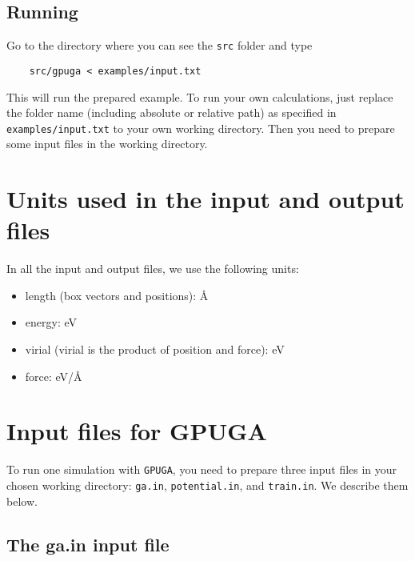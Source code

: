 \documentclass[12pt,a4paper]{report}
\begin{document}
\subsection{Running}

Go to the directory where you can see the \verb"src" folder and type
\begin{verbatim}
    src/gpuga < examples/input.txt
\end{verbatim}
This will run the prepared example. To run your own calculations, just replace the folder name (including absolute or relative path) as specified in \verb"examples/input.txt" to your own working directory. Then you need to prepare some input files in the working directory.

\section{Units used in the input and output files}

In all the input and output files, we use the following units:
\begin{itemize}
\item length (box vectors and positions): \AA
\item energy: eV
\item virial (virial is the product of position and force): eV
\item force: eV/\AA
\end{itemize}

\section{Input files for GPUGA}

To run one simulation with \verb"GPUGA", you need to prepare three input files in your chosen working directory: \verb"ga.in", \verb"potential.in", and \verb"train.in". We describe them below.

\subsection{The ga.in input file}
\end{document}
